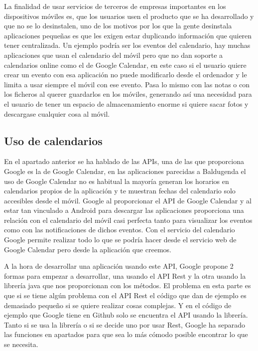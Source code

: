 La finalidad de usar servicios de terceros de empresas importantes en los dispositivos móviles es, que los usuarios usen el producto que se ha desarrollado y que no se lo desinstalen, uno de los motivos por los que la gente desinstala aplicaciones pequeñas es que les exigen estar duplicando información que quieren tener centralizada. Un ejemplo podría ser los eventos del calendario, hay muchas aplicaciones que usan el calendario del móvil pero que no dan soporte a calendarios online como el de Google Calendar, en este caso si el usuario quiere crear un evento con esa aplicación no puede modificarlo desde el ordenador y le limita a usar siempre el móvil con ese evento.
Pasa lo mismo con las notas o con los ficheros al querer guardarlos en los móviles, generando así una necesidad para el usuario de tener un espacio de almacenamiento enorme si quiere sacar fotos y descargase cualquier cosa al móvil.

\subsection{Uso de calendarios}
\label{subsecc:Uso de calendarios}

En el apartado anterior se ha hablado de las APIs,  una de las que proporciona Google es la de Google Calendar, en las aplicaciones parecidas a Baldugenda el uso de Google Calendar no es habitual la mayoría generan los horarios en calendarios propios de la aplicación y te muestran fechas del calendario solo accesibles desde el móvil.
Google al proporcionar el API de Google Calendar y al estar tan vinculado a Android para descargar las aplicaciones proporciona una relación con el calendario del móvil casi perfecta tanto para visualizar los eventos como con las notificaciones de dichos eventos.
Con el servicio del calendario Google permite realizar todo lo que se podría hacer desde el servicio web de Google Calendar pero desde la aplicación que creemos.

A la hora de desarrollar una aplicación usando este API, Google propone 2 formas para empezar a desarrollar, una usando el API Rest y la otra usando la librería java que nos proporcionan con los métodos.
El problema en esta parte es que si se tiene algún problema con el API Rest el código que dan de ejemplo es demasiado pequeño si se quiere realizar cosas complejas. Y en el código de ejemplo que Google tiene en Github solo se encuentra el API usando la librería.
Tanto si se usa la librería o si se decide uno por usar Rest, Google ha separado las funciones en apartados para que sea lo más cómodo posible encontrar lo que se necesita.

